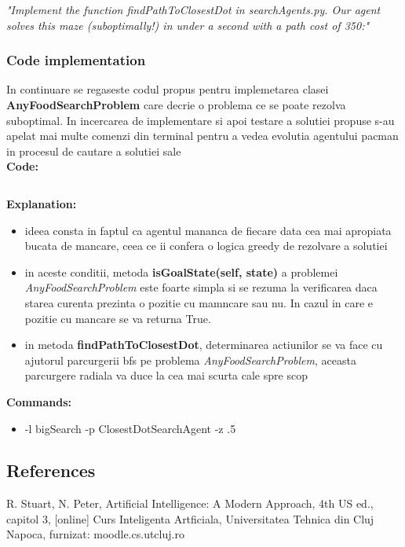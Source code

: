 \textit{"Implement the function findPathToClosestDot in searchAgents.py. Our agent solves this maze (suboptimally!) in under a second with a path cost of 350:"}


\subsubsection{Code implementation}
In continuare se regaseste codul propus pentru implemetarea clasei \textbf{AnyFoodSearchProblem} care decrie o problema ce se poate rezolva suboptimal. In incercarea de implementare si apoi testare a solutiei propuse s-au apelat mai multe comenzi din terminal pentru a vedea evolutia agentului pacman in procesul de cautare a solutiei sale \newline \\


\textbf{Code:}
\inputminted[linenos]{python}{code/08_suboptimal.py}

\textbf{Explanation:}
\begin{itemize}
    \setlength\itemsep{0em}
    \item ideea consta in faptul ca agentul mananca de fiecare data cea mai apropiata bucata de mancare, ceea ce ii confera o logica greedy de rezolvare a solutiei
    \item in aceste conditii, metoda \textbf{isGoalState(self, state)} a problemei \textit{AnyFoodSearchProblem} este foarte simpla si se rezuma la verificarea daca starea curenta prezinta o pozitie cu mamncare sau nu. In cazul in care e pozitie cu mancare se va returna True.
    \item in metoda \textbf{findPathToClosestDot}, determinarea actiunilor se va face cu ajutorul parcurgerii bfs pe problema \textit{AnyFoodSearchProblem}, aceasta parcurgere radiala va duce la cea mai scurta cale spre scop

\end{itemize}


\textbf{Commands:}
\begin{itemize}
    \setlength\itemsep{0em}
    \item  -l bigSearch -p ClosestDotSearchAgent -z .5
        
\end{itemize}

\vspace{0.75cm}

\subsection{References}
R. Stuart, N. Peter, Artificial Intelligence: A Modern Approach, 4th US ed., capitol 3, [online] \newline
Curs Inteligenta Artficiala, Universitatea Tehnica din Cluj Napoca, furnizat: moodle.cs.utcluj.ro